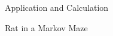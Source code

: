 \documentclass[12pt]{article}
\newcommand{\matindex}[1]{\mbox{\scriptsize#1}}
\numberwithin{equation}{section}
\begin{document}
\begin{section}{Application and Calculation}
\begin{subsection}{Rat in a Markov Maze}
\begin{enumerate}
%


\end{enumerate}
\end{subsection}
\end{section}
\end{document}
